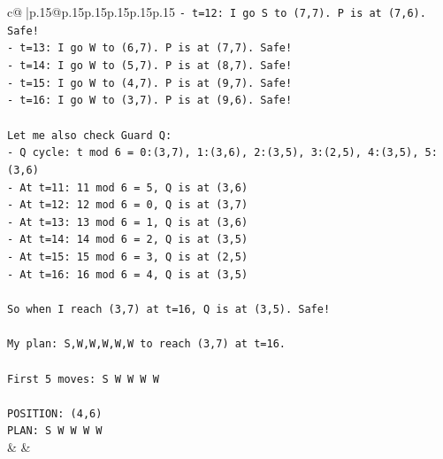 \documentclass{article}
\begin{document}
{\begin{supertabular}{c@{$\;$}|p{.15\linewidth}@{}p{.15\linewidth}p{.15\linewidth}p{.15\linewidth}p{.15\linewidth}p{.15\linewidth}}
{{{\texttt{{-} t=12: I go S to (7,7). P is at (7,6). Safe!} \\
\texttt{{-} t=13: I go W to (6,7). P is at (7,7). Safe!} \\
\texttt{{-} t=14: I go W to (5,7). P is at (8,7). Safe!} \\
\texttt{{-} t=15: I go W to (4,7). P is at (9,7). Safe!} \\
\texttt{{-} t=16: I go W to (3,7). P is at (9,6). Safe!} \\
\\ 
\texttt{Let me also check Guard Q:} \\
\texttt{{-} Q cycle: t mod 6 = 0:(3,7), 1:(3,6), 2:(3,5), 3:(2,5), 4:(3,5), 5:(3,6)} \\
\texttt{{-} At t=11: 11 mod 6 = 5, Q is at (3,6)} \\
\texttt{{-} At t=12: 12 mod 6 = 0, Q is at (3,7)} \\
\texttt{{-} At t=13: 13 mod 6 = 1, Q is at (3,6)} \\
\texttt{{-} At t=14: 14 mod 6 = 2, Q is at (3,5)} \\
\texttt{{-} At t=15: 15 mod 6 = 3, Q is at (2,5)} \\
\texttt{{-} At t=16: 16 mod 6 = 4, Q is at (3,5)} \\
\\ 
\texttt{So when I reach (3,7) at t=16, Q is at (3,5). Safe!} \\
\\ 
\texttt{My plan: S,W,W,W,W,W to reach (3,7) at t=16.} \\
\\ 
\texttt{First 5 moves: S W W W W} \\
\\ 
\texttt{POSITION: (4,6)} \\
\texttt{PLAN: S W W W W} \\
            }
        }
    }
    & & \\ \\


\end{supertabular}}
\end{document}
